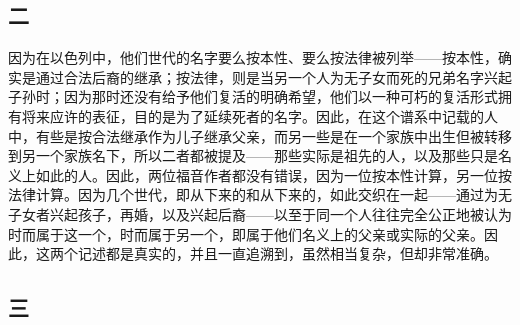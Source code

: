 
\subsection{二}

因为在以色列中，他们世代的名字要么按本性、要么按法律被列举——按本性，确实是通过合法后裔的继承；按法律，则是当另一个人为无子女而死的兄弟名字兴起子孙时；因为那时还没有给予他们复活的明确希望，他们以一种可朽的复活形式拥有将来应许的表征，目的是为了延续死者的名字。因此，在这个谱系中记载的人中，有些是按合法继承作为儿子继承父亲，而另一些是在一个家族中出生但被转移到另一个家族名下，所以二者都被提及——那些实际是祖先的人，以及那些只是名义上如此的人。因此，两位福音作者都没有错误，因为一位按本性计算，另一位按法律计算。因为几个世代，即从下来的和从下来的，如此交织在一起——通过为无子女者兴起孩子，再婚，以及兴起后裔——以至于同一个人往往完全公正地被认为时而属于这一个，时而属于另一个，即属于他们名义上的父亲或实际的父亲。因此，这两个记述都是真实的，并且一直追溯到，虽然相当复杂，但却非常准确。\par


\subsection{三}

